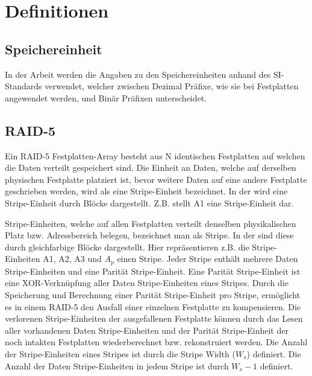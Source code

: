 
\cleardoublepage
\chapter{Definitionen}

\section{Speichereinheit}
In der Arbeit werden die Angaben zu den Speichereinheiten anhand des SI-Standards \cite{Technology1998} verwendet, welcher zwischen Dezimal Präfixe, wie sie bei Festplatten angewendet werden, und Binär Präfixen unterscheidet.

\section{RAID-5}\label{RAID-5}

Ein RAID-5 Festplatten-Array besteht aus N identischen Festplatten auf welchen die Daten verteilt gespeichert sind. Die Einheit an Daten, welche auf derselben physischen Festplatte platziert ist, bevor weitere Daten auf eine andere Festplatte geschrieben werden, wird als eine Stripe-Einheit bezeichnet.
In der  wird eine Stripe-Einheit durch Blöcke dargestellt. Z.B. stellt A1 eine Stripe-Einheit dar. \cite{Kuratti1995}

Stripe-Einheiten, welche auf allen Festplatten verteilt denselben physikalischen Platz bzw. Adressbereich belegen, bezeichnet man als Stripe. In der  sind diese durch gleichfarbige Blöcke dargestellt. Hier repräsentieren z.B. die Stripe-Einheiten A1, A2, A3 und $A_{p}$ einen Stripe.
Jeder Stripe enthält mehrere Daten Stripe-Einheiten und eine Parität Stripe-Einheit. Eine Parität Stripe-Einheit ist eine XOR-Verknüpfung aller Daten Stripe-Einheiten eines Stripes. Durch die Speicherung und Berechnung einer Parität Stripe-Einheit pro Stripe, ermöglicht es in einem RAID-5 den Ausfall einer einzelnen Festplatte zu kompensieren. Die verlorenen Stripe-Einheiten der ausgefallenen Festplatte können durch das Lesen aller vorhandenen Daten Stripe-Einheiten und der Parität Stripe-Einheit der noch intakten Festplatten wiederberechnet bzw. rekonstruiert werden. Die Anzahl der Stripe-Einheiten eines Stripes ist durch die Stripe Width  ($W_{s}$) definiert. Die Anzahl der Daten Stripe-Einheiten in jedem Stripe ist durch $W_{s} -1$ definiert. \cite{Kuratti1995}

